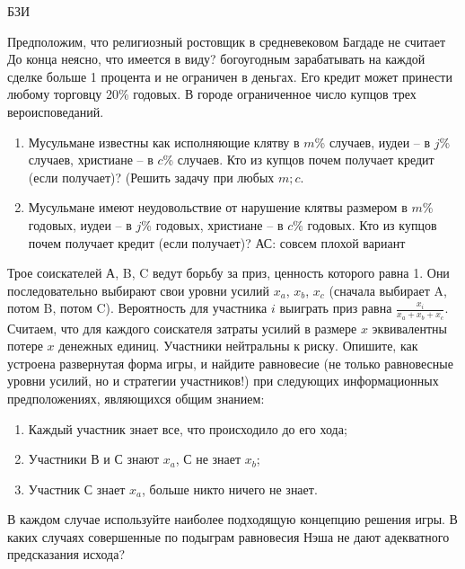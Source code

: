 \begin{problem}\begin{source}
БЗИ
\end{source}
Предположим, что религиозный ростовщик в средневековом Багдаде
не считает {\red До конца неясно, что имеется в виду?} богоугодным зарабатывать на каждой сделке больше
1 процента и не ограничен в деньгах. Его кредит может
принести любому торговцу 20\% годовых. В городе
ограниченное число купцов трех вероисповеданий. 

\begin{enumerate}
\item
Мусульмане
известны как исполняющие клятву в $m$\% случаев, иудеи -- в
$j$\% случаев, христиане -- в $c$\% случаев. Кто из купцов
почем получает кредит (если получает)? (Решить задачу при любых $m;c$.

\item Мусульмане имеют неудовольствие от нарушение
клятвы размером в $m$\% годовых, иудеи -- в $j$\% годовых,
христиане -- в $c$\% годовых. Кто из купцов почем получает
кредит (если получает)? {\red АС: совсем плохой вариант}
\end{enumerate}
\begin{sol}

\end{sol}
\end{problem}






\begin{problem}\begin{source}
\cite{savva:nmu}
\end{source}
 Трое соискателей А, B, C ведут борьбу за приз, ценность которого равна 1. Они последовательно выбирают свои уровни усилий $x_{a}$, $x_{b}$, $x_{c}$ (сначала выбирает A, потом B, потом C). Вероятность для участника $i$ выиграть приз равна $\frac{x_{i}}{x_{a}+x_{b}+x_{c}}$. Считаем, что для каждого соискателя затраты усилий в размере $x$ эквивалентны потере $x$ денежных единиц. Участники нейтральны к риску.
Опишите, как устроена развернутая форма игры, и найдите равновесие (не только равновесные уровни усилий, но и стратегии участников!) при следующих информационных предположениях, являющихся общим знанием:
\begin{enumerate}
\item Каждый участник знает все, что происходило до его хода;
\item Участники В и С знают $x_{a}$, С не знает $x_{b}$;
\item Участник С знает $x_{a}$, больше никто ничего не знает.
\end{enumerate}
В каждом случае используйте наиболее подходящую концепцию решения игры. В каких случаях совершенные по подыграм равновесия Нэша не дают адекватного предсказания исхода?


\begin{sol}

\end{sol}
\end{problem}





